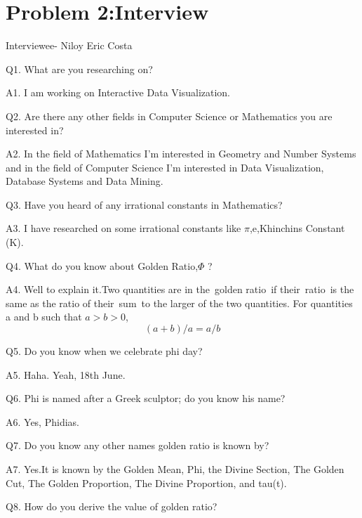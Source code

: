\documentclass[12pt]{extarticle}
\begin{document}
\newpage
\section{Problem 2:Interview}


\hspace{2cm}      Interviewee- Niloy Eric Costa \newline


Q1. What are you researching on?


A1. I am working on Interactive Data Visualization.\newline

Q2. Are there any other fields in Computer Science or Mathematics you are interested in?

A2. In the field of Mathematics I'm interested in Geometry and Number Systems and in the field of Computer Science I'm interested in Data Visualization, Database Systems and Data Mining.
\newline 


Q3. Have you heard of any irrational constants in Mathematics? 


A3. I have researched on some irrational constants like $\pi$,e,Khinchins Constant (K).
\newline

     Q4. What do you know about Golden Ratio,$\Phi$ ?
     
     
     A4. Well to explain it.Two quantities are in the golden ratio if their ratio is the same as the ratio of their sum to the
larger of the two quantities. For quantities a and b such that $a > b > 0$,
$$(a+b)/a =a/b$$
     \newline

    Q5. Do you know when we celebrate phi day?
    
    
    A5. Haha. Yeah, 18th June.
    \newline
    
    Q6. Phi is named after a Greek sculptor; do you know his name?
    
    
    A6. Yes, Phidias.
    \newline

   Q7. Do you know any other names golden ratio is known by?
   
   
   A7. Yes.It is known by the Golden Mean, Phi, the Divine Section, The Golden Cut, The Golden Proportion, The Divine Proportion, and tau(t).
   \newline
   
   Q8. How do you derive the value of golden ratio? 
   
\end{document}
